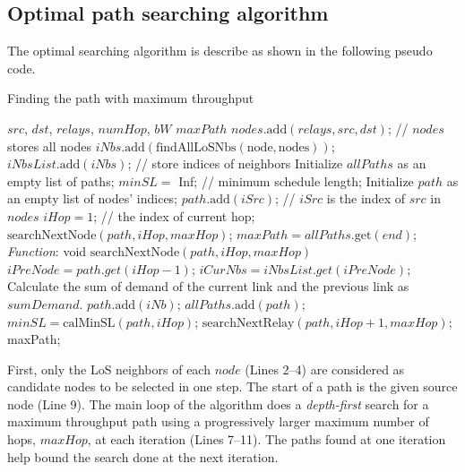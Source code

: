 \documentclass[paper=a4, fontsize=11pt]{scrartcl}
\numberwithin{equation}{section}		%
\numberwithin{figure}{section}			%
\numberwithin{table}{section}				%
\begin{document}
\subsection{Optimal path searching algorithm}
The optimal searching algorithm is describe as shown in the following pseudo code.

\begin{algorithm}[h!]
	\caption{Finding the path with maximum throughput}
	{\fontsize{10}{10}\selectfont
		\begin{algorithmic}[1]
			\renewcommand{\algorithmicrequire}{\textbf{Input:}}
			\renewcommand{\algorithmicensure}{\textbf{Output:}}
			\REQUIRE $src$, $dst$, $relays$, $numHop$, $bW$
			\ENSURE  $maxPath$
			\STATE $nodes.\mathrm{add}(relays,src,dst)$; // $nodes$ stores all nodes
			\STATE $iNbs.\mathrm{add}(\mathrm{findAllLoSNbs(node,nodes)})$;
			\STATE $iNbsList.\mathrm{add}(iNbs)$; // store indices of neighbors
			\ENDFOR
			\STATE Initialize $allPaths$ as an empty list of paths;
			\STATE $minSL = $ Inf; // minimum schedule length;
			\STATE Initialize $path$ as an empty list of nodes' indices;
			\STATE $path.\mathrm{add}(iSrc)$; // $iSrc$ is the index of $src$ in $nodes$ 
			\STATE $iHop = 1$; // the index of current hop;
			\STATE $\mathrm{searchNextNode}(path,iHop,maxHop)$;
			\ENDFOR
			\STATE $maxPath = allPaths.\mathrm{get}(end)$;
			\\ \textit{Function}: void $\mathrm{searchNextNode}(path,iHop,maxHop)$
			\STATE $iPreNode = path.get(iHop-1)$;
			\STATE $iCurNbs = iNbsList.get(iPreNode)$;
			\STATE Calculate the sum of demand of the current link and the previous
			link as $sumDemand$.
			\RETURN
			\ENDIF
			\STATE $path.\mathrm{add}(iNb)$;
			\STATE $allPaths.\mathrm{add}(path)$;
			\STATE $minSL = \mathrm{calMinSL}(path,iHop)$;
			\ENDIF
			\STATE $\mathrm{searchNextRelay}(path,iHop+1,maxHop)$;
			\ENDIF
			\ENDIF
			\ENDFOR
			\ENDIF
			\RETURN maxPath;
		\end{algorithmic}
	}
\end{algorithm}
First, only the LoS neighbors of each $node$ (Lines 2--4) are considered as 
candidate nodes to be selected in one step.  The start of a path is the 
given source node (Line 9).  The main loop of the algorithm does a
\textit{depth-first} search for a maximum throughput path using a progressively 
larger maximum number of hops, $maxHop$, at each iteration (Lines 7--11).  The 
paths found at one iteration help bound the search done at the next iteration.
\end{document}
